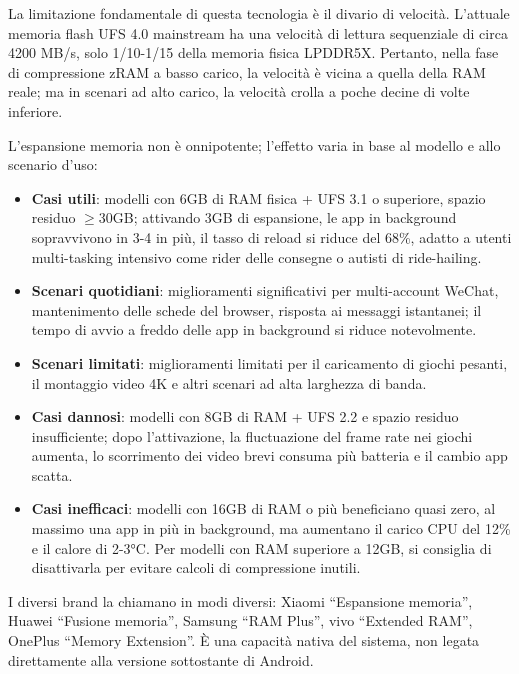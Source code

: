 
La limitazione fondamentale di questa tecnologia è il divario di velocità. L'attuale memoria flash UFS 4.0 mainstream ha una velocità di lettura sequenziale di circa 4200 MB/s, solo 1/10-1/15 della memoria fisica LPDDR5X. Pertanto, nella fase di compressione zRAM a basso carico, la velocità è vicina a quella della RAM reale; ma in scenari ad alto carico, la velocità crolla a poche decine di volte inferiore.


L'espansione memoria non è onnipotente; l'effetto varia in base al modello e allo scenario d'uso:

\begin{itemize}
  \item \textbf{Casi utili}: modelli con 6GB di RAM fisica + UFS 3.1 o superiore, spazio residuo $\geq$30GB; attivando 3GB di espansione, le app in background sopravvivono in 3-4 in più, il tasso di reload si riduce del 68\%, adatto a utenti multi-tasking intensivo come rider delle consegne o autisti di ride-hailing.
  \item \textbf{Scenari quotidiani}: miglioramenti significativi per multi-account WeChat, mantenimento delle schede del browser, risposta ai messaggi istantanei; il tempo di avvio a freddo delle app in background si riduce notevolmente.
  \item \textbf{Scenari limitati}: miglioramenti limitati per il caricamento di giochi pesanti, il montaggio video 4K e altri scenari ad alta larghezza di banda.
  \item \textbf{Casi dannosi}: modelli con 8GB di RAM + UFS 2.2 e spazio residuo insufficiente; dopo l'attivazione, la fluctuazione del frame rate nei giochi aumenta, lo scorrimento dei video brevi consuma più batteria e il cambio app scatta.
  \item \textbf{Casi inefficaci}: modelli con 16GB di RAM o più beneficiano quasi zero, al massimo una app in più in background, ma aumentano il carico CPU del 12\% e il calore di 2-3°C. Per modelli con RAM superiore a 12GB, si consiglia di disattivarla per evitare calcoli di compressione inutili.
\end{itemize}


I diversi brand la chiamano in modi diversi: Xiaomi “Espansione memoria”, Huawei “Fusione memoria”, Samsung “RAM Plus”, vivo “Extended RAM”, OnePlus “Memory Extension”. È una capacità nativa del sistema, non legata direttamente alla versione sottostante di Android.

